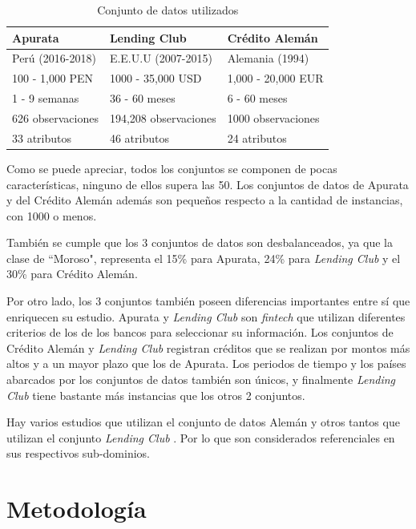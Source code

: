 \begin{table}
	\centering
	\caption{Conjunto de datos utilizados}
	\label{tab:dataset-comparison}
	\begin{tabular}{@{}lll@{}}
	\toprule
	\textbf{Apurata}	& \textbf{Lending Club}		& \textbf{Crédito Alemán}	\\
	\midrule
	Perú (2016-2018)	& E.E.U.U (2007-2015)		& Alemania (1994)			\\
	100 - 1,000 PEN		& 1000 - 35,000 USD			& 1,000 - 20,000 EUR		\\
	1 - 9 semanas		& 36 - 60 meses				& 6 - 60 meses				\\
	626 observaciones	& 194,208 observaciones		& 1000 observaciones		\\
	33 atributos		& 46 atributos				& 24 atributos				\\
	\bottomrule
	\end{tabular}
\end{table}

Como se puede apreciar, todos los conjuntos se componen de pocas características, ninguno de ellos supera las 50. Los conjuntos de datos de Apurata y del Crédito Alemán además son pequeños respecto a la cantidad de instancias, con 1000 o menos.

También se cumple que los 3 conjuntos de datos son desbalanceados, ya que la clase de ``Moroso", representa el 15\% para Apurata, 24\% para \textit{Lending Club} y el 30\% para Crédito Alemán.

Por otro lado, los 3 conjuntos también poseen diferencias importantes entre sí que enriquecen su estudio. Apurata y \textit{Lending Club} son \textit{fintech} que utilizan diferentes criterios de los de los bancos para seleccionar su información. Los conjuntos de Crédito Alemán y \textit{Lending Club} registran créditos que se realizan por montos más altos y a un mayor plazo que los de Apurata. Los periodos de tiempo y los países abarcados por los conjuntos de datos también son únicos, y finalmente \textit{Lending Club} tiene bastante más instancias que los otros 2 conjuntos.

Hay varios estudios que utilizan el conjunto de datos Alemán \citep{harris2015credit, nanni2009experimental, brown2012experimental, wang2012two} y otros tantos que utilizan el conjunto \textit{Lending Club} \citep{malekipirbazari2015risk, zhang2016research, zang2014credit, tan2018deep}. Por lo que son considerados referenciales en sus respectivos sub-dominios.

\section{Metodología}

